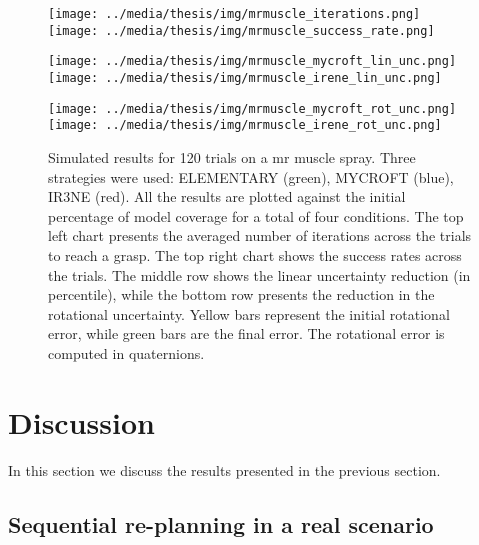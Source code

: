 \begin{figure}[!ht]
\centerline{
\texttt{[image: ../media/thesis/img/mrmuscle\_iterations.png]}
\texttt{[image: ../media/thesis/img/mrmuscle\_success\_rate.png]}
}
\centerline{
\texttt{[image: ../media/thesis/img/mrmuscle\_mycroft\_lin\_unc.png]}
\texttt{[image: ../media/thesis/img/mrmuscle\_irene\_lin\_unc.png]}
}
\centerline{
\texttt{[image: ../media/thesis/img/mrmuscle\_mycroft\_rot\_unc.png]}
\texttt{[image: ../media/thesis/img/mrmuscle\_irene\_rot\_unc.png]}
}

\caption[Simulated results on a mr muscle spray]{Simulated results for 120 trials on a mr muscle spray. Three strategies were used: ELEMENTARY (green), MYCROFT (blue), IR3NE (red). All the results are plotted against the initial percentage of model coverage for a total of four conditions. The top left chart presents the averaged number of iterations across the trials to reach a grasp. The top right chart shows the success rates across the trials. The middle row shows the linear uncertainty reduction (in percentile), while the bottom row presents the reduction in the rotational uncertainty. Yellow bars represent the initial rotational error, while green bars are the final error. The rotational error is computed in quaternions.}
\label{fig:07:mrmuscle_results}
\end{figure} 

%
%
\newpage
\section{Discussion}\label{sec:ch06_summary}

In this section we discuss the results presented in the previous section.

\subsection{Sequential re-planning in a real scenario}\label{sec:07:boris_discussion}

